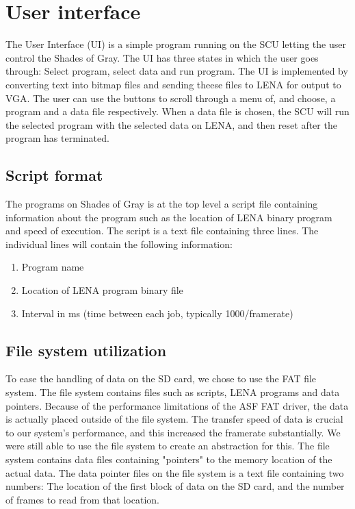 \section{User interface}
The User Interface (UI) is a simple program running on the \ac{SCU} letting the user control the { Shades of Gray}. The UI has three states in which the user goes through: Select program, select data and run program. The UI is implemented by converting text into bitmap files and sending theese files to \ac{LENA} for output to VGA. The user can use the buttons to scroll through a menu of, and choose, a program and a data file respectively. When a data file is chosen, the \ac{SCU} will run the selected program with the selected data on \ac{LENA}, and then reset after the program has terminated.


\subsection{Script format}
The programs on { Shades of Gray} is at the top level a script file
containing information about the program such as the location of \ac{LENA} binary program and speed of execution. The script is a text file containing three lines. The individual lines will
contain the following information:

\begin{enumerate}
\item Program name
\item Location of \ac{LENA} program binary file
\item Interval in ms (time between each job, typically 1000/framerate)
\end{enumerate}

\subsection{File system utilization}
To ease the handling of data on the SD card, we chose to use the FAT
file system. The file system contains files such as scripts, \ac{LENA} programs
and data pointers. Because of the performance limitations of the \ac{ASF} FAT driver, the data is actually
placed outside of the file system. The transfer speed of data is crucial to our
system's performance, and this increased the framerate substantially. We were
still able to use the file system to create an abstraction for this. The file
system contains data files containing "pointers" to the memory location of the
actual data. The data pointer files on the file system is a text file containing
two numbers: The location of the first block of data on the SD card,
and the number of frames to read from that location.

